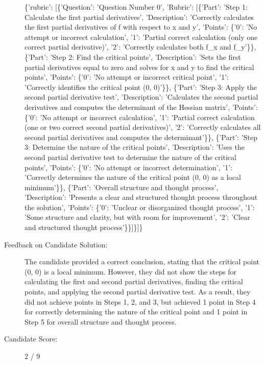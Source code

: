 \documentclass{article}%
\begin{document}
\begin{description}
\{'rubric': {[}\{'Question': 'Question Number 0', 'Rubric': {[}\{'Part': 'Step 1: Calculate the first partial derivatives', 'Description': 'Correctly calculates the first partial derivatives of f with respect to x and y', 'Points': \{'0': 'No attempt or incorrect calculation', '1': 'Partial correct calculation (only one correct partial derivative)', '2': 'Correctly calculates both f\_x and f\_y'\}\}, \{'Part': 'Step 2: Find the critical points', 'Description': 'Sets the first partial derivatives equal to zero and solves for x and y to find the critical points', 'Points': \{'0': 'No attempt or incorrect critical point', '1': 'Correctly identifies the critical point (0, 0)'\}\}, \{'Part': 'Step 3: Apply the second partial derivative test', 'Description': 'Calculates the second partial derivatives and computes the determinant of the Hessian matrix', 'Points': \{'0': 'No attempt or incorrect calculation', '1': 'Partial correct calculation (one or two correct second partial derivatives)', '2': 'Correctly calculates all second partial derivatives and computes the determinant'\}\}, \{'Part': 'Step 3: Determine the nature of the critical points', 'Description': 'Uses the second partial derivative test to determine the nature of the critical points', 'Points': \{'0': 'No attempt or incorrect determination', '1': 'Correctly determines the nature of the critical point (0, 0) as a local minimum'\}\}, \{'Part': 'Overall structure and thought process', 'Description': 'Presents a clear and structured thought process throughout the solution', 'Points': \{'0': 'Unclear or disorganized thought process', '1': 'Some structure and clarity, but with room for improvement', '2': 'Clear and structured thought process'\}\}{]}\}{]}\}%
\item[Feedback on Candidate Solution: ]%
The candidate provided a correct conclusion, stating that the critical point (0, 0) is a local minimum. However, they did not show the steps for calculating the first and second partial derivatives, finding the critical points, and applying the second partial derivative test. As a result, they did not achieve points in Steps 1, 2, and 3, but achieved 1 point in Step 4 for correctly determining the nature of the critical point and 1 point in Step 5 for overall structure and thought process.%
\item[Candidate Score: ]%
2 / 9%
\end{description}

%
\end{document}
